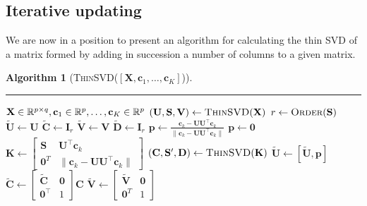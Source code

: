 \documentclass[11pt,a4paper]{article}
\theoremstyle{mybreak}
\newtheorem{algorithm}{Algorithm}
\numberwithin{dummy}{section}
\theoremstyle{plain}
\theoremstyle{plain}
\theoremstyle{plain}
\theoremstyle{plain}
\theoremstyle{MyNonumberplain}
\newcommand{\0}{\M{0}}
\newcommand{\M}[1]{\mathbf{#1}}
\newcommand{\Mt}[1]{\tilde{\M{#1}}}
\newcommand{\R}{\mathbb{R}}
\newcommand{\T}{\top}
\newcommand{\ve}[1]{\mathbf{#1}}
\newcommand{\Mat}[2]{%
  \ifthenelse{\equal{#2}{1}}
  {\R^{#1}}
  {\R^{#1 \times #2}}
}
\begin{document}
\subsection{Iterative updating}

We are now in a position to present an algorithm for calculating the thin SVD of a matrix formed by adding in succession a number of columns to a given matrix.

\begin{algorithm}[\textnormal{\textsc{ThinSVD}($[\M{X}, \ve{c}_1, \dots, \ve{c}_K]$)}]
  \rule{\textwidth}{0.4pt}
  \begin{algorithmic}[1]
    \Require $\M{X} \in \Mat{p}{q}, \ve{c}_1 \in \R^p, \dots, \ve{c}_K \in \R^p$
    \State $(\M{U}, \M{S}, \M{V}) \gets \textsc{ThinSVD}(\M{X})$
    \State $r \gets \textsc{Order}(\M{S})$
    \State $\Mt{U} \gets \M{U}$
    \State $\Mt{C} \gets \M{I}_r$
    \State $\Mt{V} \gets \M{V}$
    \State $\Mt{D} \gets \M{I}_r$
    \If {$\ve{c}_k - \M{U}\M{U}^\T \ve{c}_k \neq \0$ }
    \State $\ve{p} \gets \frac{\ve{c}_k - \M{U}\M{U}^\T \ve{c}_k}{\| \ve{c}_k - \M{U}\M{U}^\T \ve{c}_k\|} $
    \Else
    \State $\ve{p} \gets \0$
    \EndIf
    \State  
    \begin{math}
      \M{K}
      \gets
      \begin{bmatrix}
        \M{S} & \M{U}^\T \ve{c}_k \\
        \0^T & \| \ve{c}_k - \M{U} \M{U}^\T \ve{c}_k \|
      \end{bmatrix}
    \end{math}
    \State
    $(\M{C}, \M{S}', \M{D}) \gets \textsc{ThinSVD}(\M{K})$
    \If {$\ve{p} \neq \0$}
    \State
    \begin{math}
      \Mt{U} \gets [\Mt{U}, \ve{p}]
    \end{math}
    \State
    \begin{math}
      \Mt{C}
      \gets
      \begin{bmatrix}
        \Mt{C} & \0
        \\
        \0^\T & 1
      \end{bmatrix}
      \M{C}
    \end{math}
    \State
    \begin{math}
      \Mt{V}
      \gets
      \begin{bmatrix}
        \Mt{V} & \0
        \\
        \0^T & 1
      \end{bmatrix} 
    \end{math}

\end{algorithmic}
\end{algorithm}
\end{document}
